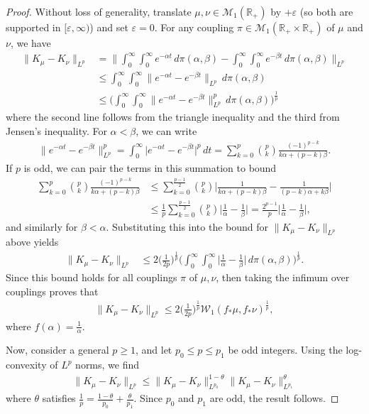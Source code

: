 \documentclass{cams-l} %
\newcommand{\dave}[1]{#1}\newcommand{\davebegin}{}\newcommand{\daveend}{}\newcommand{\george}[1]{#1}
\newcommand{\RR}{\mathbb R}
\newcommand{\cM}{\mathcal M}
\newcommand{\eps}{\varepsilon}
\theoremstyle{definition}
\theoremstyle{remark}
\numberwithin{equation}{section}
\begin{document}
\begin{proof}
    Without loss of generality, translate $\mu, \nu \in \cM_1(\RR_+)$ by $+\eps$ (so both are supported in $[\eps,\infty)$) and set $\varepsilon = 0$. For any coupling $\pi \in \cM_1(\RR_+\times\RR_+)$ of $\mu$ and $\nu$, we have
    \begin{align*}
        \|K_\mu - K_\nu\|_{L^p} &= \Big\|\int_0^\infty\int_0^\infty e^{-\alpha t}\,d\pi(\alpha, \beta) - \int_0^\infty\int_0^\infty e^{-\beta t}\,d\pi(\alpha, \beta)\Big\|_{L^p}\\
        &\leq \int_0^\infty\int_0^\infty \|e^{-\alpha t} - e^{-\beta t}\|_{L^p}\,d\pi(\alpha, \beta)\\
        &\leq \Big(\int_0^\infty\int_0^\infty \|e^{-\alpha t} - e^{-\beta t}\|_{L^p}^p\,d\pi(\alpha, \beta)\Big)^\frac{1}{p}
    \end{align*}
    where the second line follows from the triangle inequality and the third from Jensen's inequality. For $\alpha < \beta$, we can write
    \begin{align*}
        \|e^{-\alpha t} - e^{-\beta t}\|_{L^p}^p = \int_0^\infty\big|e^{-\alpha t} - e^{-\beta t}\big|^p\,dt = \sum_{k=0}^p \binom{p}{k} \frac{(-1)^{p-k}}{k\alpha + (p-k)\beta}.
    \end{align*}
    If $p$ is odd, we can pair the terms in this summation to bound
    \begin{align*}
        \sum_{k=0}^p \binom{p}{k} \frac{(-1)^{p-k}}{k\alpha + (p-k)\beta} &\leq \sum_{k=0}^\frac{p-1}{2} \binom{p}{k} \Big|\frac{1}{k\alpha + (p-k)\beta} - \frac{1}{(p-k)\alpha + k\beta}\Big|\\
        &\leq \frac{1}{p}\sum_{k=0}^\frac{p-1}{2} \binom{p}{k}\Big|\frac{1}{\alpha} - \frac{1}{\beta}\Big| = \frac{2^{p-1}}{p}\Big|\frac{1}{\alpha} - \frac{1}{\beta}\Big|,
    \end{align*}
    and similarly for $\beta<\alpha$. Substituting this into the bound for $\|K_\mu - K_\nu\|_{L^p}$ above yields
    \begin{align*}
        \|K_\mu - K_\nu\|_{L^p} &\leq 2\big(\tfrac{1}{2p}\big)^\frac{1}{p} \Big(\int_0^\infty\int_0^\infty\Big|\frac{1}{\alpha} - \frac{1}{\beta}\Big|\,d\pi(\alpha, \beta)\Big)^\frac{1}{p}.
    \end{align*}
    Since this bound holds for all couplings $\pi$ of $\mu, \nu$, then taking the infimum over couplings proves that
    \begin{align*}
        \|K_\mu - K_\nu\|_{L^p} \leq 2\big(\tfrac{1}{2p}\big)^\frac{1}{p} \mathcal{W}_1(f_*\mu, f_*\nu)^\frac{1}{p},
    \end{align*}
    where $f(\alpha) = \tfrac{1}{\alpha}$. 
    
    Now, consider a general $p\geq 1$, and let $p_0 \leq p \leq p_1$ be odd integers. Using the log-convexity of $L^p$ norms, we find
    \begin{align*}
        \|K_\mu - K_\nu\|_{L^p} \leq \|K_\mu - K_\nu\|_{L^{p_0}}^{1-\theta}\|K_\mu - K_\nu\|_{L^{p_1}}^{\theta}
    \end{align*}
    where $\theta$ satisfies $\tfrac{1}{p} = \tfrac{1-\theta}{p_0} + \tfrac{\theta}{p_1}$. Since $p_0$ and $p_1$ are odd, \dave{the result follows}.
\end{proof}
\end{document}
